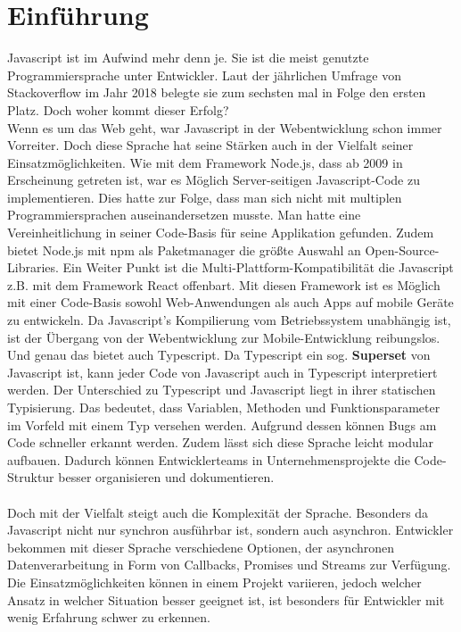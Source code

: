 \setcounter{secnumdepth}{1}

\section{Einführung}

Javascript ist im Aufwind mehr denn je. Sie ist die meist genutzte Programmiersprache unter Entwickler. Laut der jährlichen Umfrage von Stackoverflow im Jahr 2018 belegte sie zum sechsten mal in Folge den ersten Platz.\cite{programming-language-survey} Doch woher kommt dieser Erfolg? \\
Wenn es um das Web geht, war Javascript in der Webentwicklung schon immer Vorreiter. Doch diese Sprache hat seine Stärken auch in der Vielfalt seiner Einsatzmöglichkeiten. Wie mit dem Framework Node.js, dass ab 2009 in Erscheinung getreten ist, war es Möglich Server-seitigen Javascript-Code zu implementieren. Dies hatte zur Folge, dass man sich nicht mit multiplen Programmiersprachen auseinandersetzen musste. Man hatte eine Vereinheitlichung in seiner Code-Basis für seine Applikation gefunden. Zudem bietet Node.js mit npm als Paketmanager die größte Auswahl an Open-Source-Libraries. Ein Weiter Punkt ist die Multi-Plattform-Kompatibilität die Javascript z.B. mit dem Framework React offenbart. Mit diesen Framework ist es Möglich mit einer Code-Basis sowohl Web-Anwendungen als auch Apps auf mobile Geräte zu entwickeln. Da Javascript's Kompilierung vom Betriebssystem unabhängig ist, ist der Übergang von der Webentwicklung zur Mobile-Entwicklung reibungslos. Und genau das bietet auch Typescript. Da Typescript ein sog. \textbf{Superset} von Javascript ist, kann jeder Code von Javascript auch in Typescript interpretiert werden. Der Unterschied zu Typescript und Javascript liegt in ihrer statischen Typisierung. Das bedeutet, dass Variablen, Methoden und Funktionsparameter im Vorfeld mit einem Typ versehen werden. Aufgrund dessen können Bugs am Code schneller erkannt werden. Zudem lässt sich diese Sprache leicht modular aufbauen. Dadurch können Entwicklerteams in Unternehmensprojekte die Code-Struktur besser organisieren und dokumentieren.\\\\

\noindent
Doch mit der Vielfalt steigt auch die Komplexität der Sprache. Besonders da Javascript nicht nur synchron ausführbar ist, sondern auch asynchron. Entwickler bekommen mit dieser Sprache verschiedene Optionen, der asynchronen Datenverarbeitung in Form von Callbacks, Promises und Streams zur Verfügung. Die Einsatzmöglichkeiten können in einem Projekt variieren, jedoch welcher Ansatz in welcher Situation besser geeignet ist, ist besonders für Entwickler mit wenig Erfahrung schwer zu erkennen.


